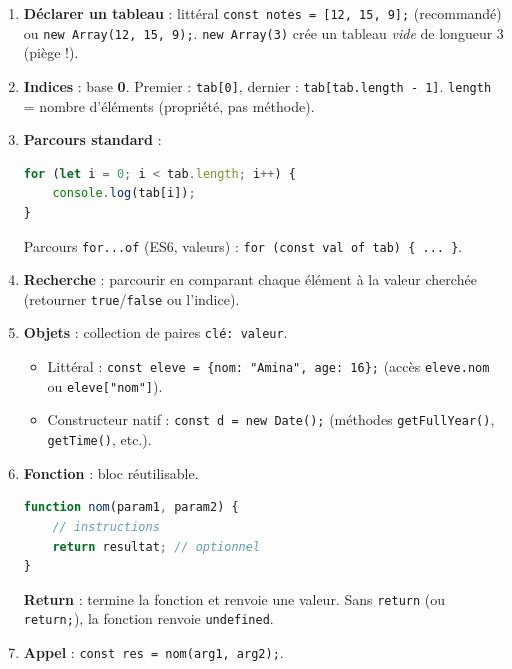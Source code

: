 \documentclass[11pt]{article}
\begin{document}
\begin{methode}
\begin{enumerate}
\item \textbf{Déclarer un tableau} : littéral \texttt{const notes = [12, 15, 9];} (recommandé) ou \texttt{new Array(12, 15, 9);}. \texttt{new Array(3)} crée un tableau \emph{vide} de longueur 3 (piège !).
\item \textbf{Indices} : base \textbf{0}. Premier : \texttt{tab[0]}, dernier : \texttt{tab[tab.length - 1]}. \texttt{length} = nombre d'éléments (propriété, pas méthode).
\item \textbf{Parcours standard} :
      \begin{lstlisting}[language=JavaScript]
for (let i = 0; i < tab.length; i++) {
    console.log(tab[i]);
}
      \end{lstlisting}
      Parcours \texttt{for...of} (ES6, valeurs) : \texttt{for (const val of tab) \{ ... \}}.
\item \textbf{Recherche} : parcourir en comparant chaque élément à la valeur cherchée (retourner \texttt{true}/\texttt{false} ou l'indice).
\item \textbf{Objets} : collection de paires \texttt{clé: valeur}.
      \begin{itemize}
      \item Littéral : \texttt{const eleve = \{nom: "Amina", age: 16\};} (accès \texttt{eleve.nom} ou \texttt{eleve["nom"]}).
      \item Constructeur natif : \texttt{const d = new Date();} (méthodes \texttt{getFullYear()}, \texttt{getTime()}, etc.).
      \end{itemize}
\item \textbf{Fonction} : bloc réutilisable.
      \begin{lstlisting}[language=JavaScript]
function nom(param1, param2) {
    // instructions
    return resultat; // optionnel
}
      \end{lstlisting}
      \textbf{Return} : termine la fonction et renvoie une valeur. Sans \texttt{return} (ou \texttt{return;}), la fonction renvoie \texttt{undefined}.
\item \textbf{Appel} : \texttt{const res = nom(arg1, arg2);}.
\end{enumerate}
\end{methode}
\end{document}
